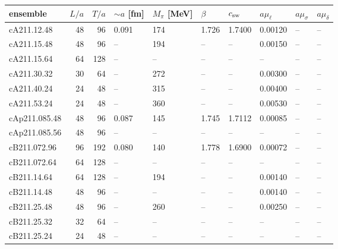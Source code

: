 \documentclass[a4paper,11pt]{article}
\begin{document}
\begin{table}
  \small
  \begin{tabular}{lrrlllllll}
    \textbf{ensemble} & $L/a$ & $T/a$ & $\sim a$ [fm] & $M_\pi$ [MeV] & $\beta$ & $c_\mathrm{sw}$ & $a\mu_\ell$ & $a\mu_\sigma$ & $a\mu_\delta$ \\ 
    \hline 
    cA211.12.48   & 48    & 96    & 0.091         & 174   & 1.726   & 1.7400 & 0.00120    & --           & -- \\
    cA211.15.48   & 48    & 96    & --            & 194   & --      & --     & 0.00150    & --           & -- \\
    cA211.15.64   & 64    & 128   & --            & --    & --      & --     & --         & --           & -- \\
    cA211.30.32   & 30    & 64    & --            & 272   & --      & --     & 0.00300    & --           & -- \\
    cA211.40.24   & 24    & 48    & --            & 315   & --      & --     & 0.00400    & --           & -- \\
    cA211.53.24   & 24    & 48    & --            & 360   & --      & --     & 0.00530    & --           & -- \\ \hline
    cAp211.085.48 & 48    & 96    & 0.087         & 145   & 1.745   & 1.7112 & 0.00085    & --           & -- \\
    cAp211.085.56 & 48    & 96    & --            & --    & --      & --     & --         & --           & -- \\ \hline
    cB211.072.96  & 96    & 192   & 0.080         & 140   & 1.778   & 1.6900 & 0.00072    & --           & -- \\
    cB211.072.64  & 64    & 128   & --            & --    & --      & --     & --         & --           & -- \\
    cB211.14.64   & 64    & 128   & --            & 194   & --      & --     & 0.00140    & --           & -- \\  
    cB211.14.48   & 48    & 96    & --            & --    & --      & --     & 0.00140    & --           & -- \\ 
    cB211.25.48   & 48    & 96    & --            & 260   & --      & --     & 0.00250    & --           & -- \\
    cB211.25.32   & 32    & 64    & --            & --    & --      & --     & --         & --           & -- \\
    cB211.25.24   & 24    & 48    & --            & --    & --      & --     & --         & --           & -- \\ \hline 

\end{tabular}
\end{table}
\end{document}
